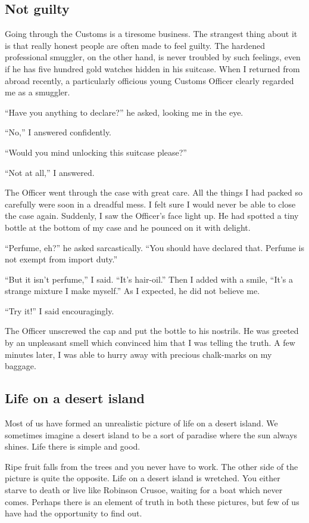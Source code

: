 \documentclass[11pt]{article}
\begin{document}
\subsection{Not guilty}
\label{sec-1-11}

Going through the Customs is a tiresome business. The strangest thing about it is that really honest people are often made to feel guilty. The hardened professional smuggler, on the other hand, is never troubled by such feelings, even if he has five hundred gold watches hidden in his suitcase. When I returned from abroad recently, a particularly officious young Customs Officer clearly regarded me as a smuggler.

``Have you anything to declare?'' he asked, looking me in the eye.

``No,'' I answered confidently.

``Would you mind unlocking this suitcase please?''

``Not at all,'' I answered. 

The Officer went through the case with great care. All the things I had packed so carefully were soon in a dreadful mess. I felt sure I would never be able to close the case again. Suddenly, I saw the Officer's face light up. He had spotted a tiny bottle at the bottom of my case and he pounced on it with delight. 

``Perfume, eh?'' he asked sarcastically. ``You should have declared that. Perfume is not exempt from import duty.''

``But it isn't perfume,'' I said. ``It's hair-oil.'' Then I added with a smile, ``It's a strange mixture I make myself.'' As I expected, he did not believe me.

``Try it!'' I said encouragingly.

The Officer unscrewed the cap and put the bottle to his nostrils. He was greeted by an unpleasant smell which convinced him that I was telling the truth. A few minutes later, I was able to hurry away with precious chalk-marks on my baggage. 
\subsection{Life on a desert island}
\label{sec-1-12}

Most of us have formed an unrealistic picture of life on a desert island. We sometimes imagine a desert island to be a sort of paradise where the sun always shines. Life there is simple and good.

Ripe fruit falls from the trees and you never have to work. The other side of the picture is quite the opposite. Life on a desert island is wretched. You either starve to death or live like Robinson Crusoe, waiting for a boat which never comes. Perhaps there is an element of truth in both these pictures, but few of us have had the opportunity to find out. 
\end{document}
